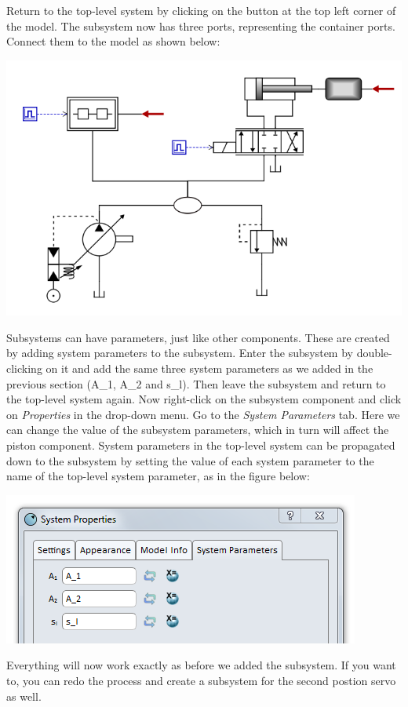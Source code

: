 \documentclass[a4paper,pdftex]{article}
\begin{document}
\begin{tutenumerate}
Return to the top-level system by clicking on the button at the top left corner of the model. The subsystem now has three ports, representing the container ports. Connect them to the model as shown below:

\includegraphics[width=0.85\linewidth]{gfx/advancedusage/connectedsubsystem.png}

Subsystems can have parameters, just like other components. These are created by adding system parameters to the subsystem. Enter the subsystem by double-clicking on it and add the same three system parameters as we added in the previous section (A\_1, A\_2 and s\_l). Then leave the subsystem and return to the top-level system again. Now right-click on the subsystem component and click on \textit{Properties} in the drop-down menu. Go to the \textit{System Parameters} tab. Here we can change the value of the subsystem parameters, which in turn will affect the piston component. System parameters in the top-level system can be propagated down to the subsystem by setting the value of each system parameter to the name of the top-level system parameter, as in the figure below:

\includegraphics[width=0.6\linewidth]{gfx/advancedusage/subsystemparameters.png}

Everything will now work exactly as before we added the subsystem. If you want to, you can redo the process and create a subsystem for the second postion servo as well.

\end{tutenumerate}
\end{document}
